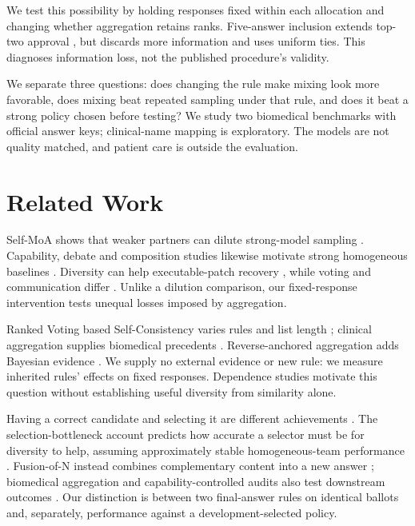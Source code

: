 \documentclass{article}
\begin{document}
We test this possibility by holding responses fixed within each allocation and changing whether aggregation retains ranks. Five-answer inclusion extends top-two approval \citep[Appendix~C]{wang2025ranked}, but discards more information and uses uniform ties. This diagnoses information loss, not the published procedure's validity.

We separate three questions: does changing the rule make mixing look more favorable, does mixing beat repeated sampling under that rule, and does it beat a strong policy chosen before testing? We study two biomedical benchmarks with official answer keys; clinical-name mapping is exploratory. The models are not quality matched, and patient care is outside the evaluation.

\section{Related Work}
Self-MoA shows that weaker partners can dilute strong-model sampling \citep{li2026selfmoa}. Capability, debate and composition studies likewise motivate strong homogeneous baselines \citep{kim2026capable,smit2024mad,wang2026sampling,abdulaal2025balancing}. Diversity can help executable-patch recovery \citep{zhang2025diversity}, while voting and communication differ \citep{choi2025debate}. Unlike a dilution comparison, our fixed-response intervention tests unequal losses imposed by aggregation.

Ranked Voting based Self-Consistency varies rules and list length \citep{wang2025ranked}; clinical aggregation supplies biomedical precedents \citep{barabucci2024combining,yuan2026mixed,zoller2025collectives,kumthekar2025second}. Reverse-anchored aggregation adds Bayesian evidence \citep{chen2026backwardanchor}. We supply no external evidence or new rule: we measure inherited rules' effects on fixed responses. Dependence studies \citep{jiang2025hivemind,kim2025correlated,eriksson2026norms,kuai2026dependence} motivate this question without establishing useful diversity from similarity alone.

Having a correct candidate and selecting it are different achievements \citep{ji2026candidate,hu2026oracle,li2026agreement}. The selection-bottleneck account predicts how accurate a selector must be for diversity to help, assuming approximately stable homogeneous-team performance \citep{maryanskyy2026selection}. Fusion-of-N instead combines complementary content into a new answer \citep{khairi2026fusion}; biomedical aggregation and capability-controlled audits also test downstream outcomes \citep{chen2026medsyn,kim2026diversityaudit}. Our distinction is between two final-answer rules on identical ballots and, separately, performance against a development-selected policy.
\end{document}

